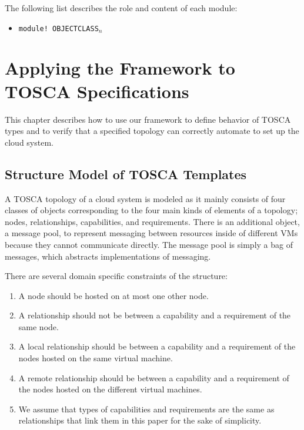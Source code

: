 \documentclass[12pt]{report}
\begin{document}
The following list describes the role and content of each module:
\begin{itemize}
\item {\tt module! OBJECTCLASS$_n$}\\

\end{itemize}

\chapter{Applying the Framework to TOSCA Specifications}
\label{chap:appTOSCA}
This chapter describes how to use our framework to define behavior of
TOSCA types and to verify that a specified topology can correctly
automate to set up the cloud system.

\section{Structure Model of TOSCA Templates}
\label{sec:TOSCAstructure}
A TOSCA topology of a cloud system is modeled as it mainly consists of
four classes of objects corresponding to the four main kinds of
elements of a topology; nodes, relationships, capabilities, and
requirements. There is an additional object, a message pool, to
represent messaging between resources inside of different VMs because
they cannot communicate directly. The message pool is simply a bag of
messages, which abstracts implementations of messaging.

There are several domain specific constraints of the structure:
\begin{enumerate}
\item A node should be hosted on at most one other node.
\item A relationship should not be between a capability and a
  requirement of the same node.
\item A local relationship should be between a capability and a
  requirement of the nodes hosted on the same virtual machine.
\item A remote relationship should be between a capability and a
  requirement of the nodes hosted on the different virtual machines.
\item We assume that types of capabilities and requirements are
  the same as relationships that link them in this paper for the sake
  of simplicity.
\end{enumerate}
\end{document}
